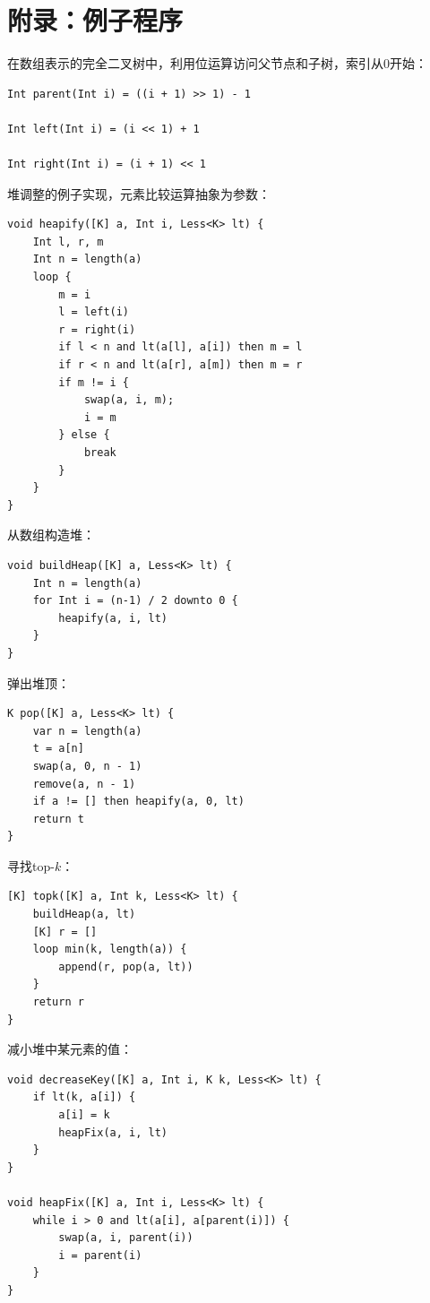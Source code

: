 \documentclass[b5paper]{ctexart}
\begin{document}
\section{附录：例子程序}

在数组表示的完全二叉树中，利用位运算访问父节点和子树，索引从0开始：

\begin{lstlisting}[language = Bourbaki]
Int parent(Int i) = ((i + 1) >> 1) - 1

Int left(Int i) = (i << 1) + 1

Int right(Int i) = (i + 1) << 1
\end{lstlisting}

堆调整的例子实现，元素比较运算抽象为参数：

\begin{lstlisting}[language = Bourbaki]
void heapify([K] a, Int i, Less<K> lt) {
    Int l, r, m
    Int n = length(a)
    loop {
        m = i
        l = left(i)
        r = right(i)
        if l < n and lt(a[l], a[i]) then m = l
        if r < n and lt(a[r], a[m]) then m = r
        if m != i {
            swap(a, i, m);
            i = m
        } else {
            break
        }
    }
}
\end{lstlisting}

从数组构造堆：

\begin{lstlisting}[language = Bourbaki]
void buildHeap([K] a, Less<K> lt) {
    Int n = length(a)
    for Int i = (n-1) / 2 downto 0 {
        heapify(a, i, lt)
    }
}
\end{lstlisting}

弹出堆顶：

\begin{lstlisting}[language = Bourbaki]
K pop([K] a, Less<K> lt) {
    var n = length(a)
    t = a[n]
    swap(a, 0, n - 1)
    remove(a, n - 1)
    if a != [] then heapify(a, 0, lt)
    return t
}
\end{lstlisting}

寻找top-$k$：

\begin{lstlisting}[language = Bourbaki]
[K] topk([K] a, Int k, Less<K> lt) {
    buildHeap(a, lt)
    [K] r = []
    loop min(k, length(a)) {
        append(r, pop(a, lt))
    }
    return r
}
\end{lstlisting}

减小堆中某元素的值：

\begin{lstlisting}[language = Bourbaki]
void decreaseKey([K] a, Int i, K k, Less<K> lt) {
    if lt(k, a[i]) {
        a[i] = k
        heapFix(a, i, lt)
    }
}

void heapFix([K] a, Int i, Less<K> lt) {
    while i > 0 and lt(a[i], a[parent(i)]) {
        swap(a, i, parent(i))
        i = parent(i)
    }
}
\end{lstlisting}
\end{document}
